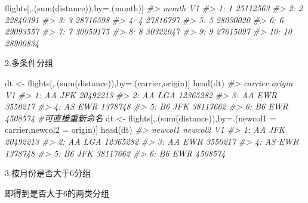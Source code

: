 \documentclass[
]{book}
\newenvironment{Shaded}{\begin{snugshade}}{\end{snugshade}}
\newcommand{\AttributeTok}[1]{\textcolor[rgb]{0.77,0.63,0.00}{#1}}
\newcommand{\CommentTok}[1]{\textcolor[rgb]{0.56,0.35,0.01}{\textit{#1}}}
\newcommand{\FunctionTok}[1]{\textcolor[rgb]{0.00,0.00,0.00}{#1}}
\newcommand{\NormalTok}[1]{#1}
\newcommand{\OtherTok}[1]{\textcolor[rgb]{0.56,0.35,0.01}{#1}}
\begin{document}
\begin{Shaded}
\begin{Highlighting}[]
\NormalTok{flights[,.(}\FunctionTok{sum}\NormalTok{(distance)),by}\OtherTok{=}\NormalTok{.(month)]}
\CommentTok{\#\textgreater{}     month       V1}
\CommentTok{\#\textgreater{}  1:     1 25112563}
\CommentTok{\#\textgreater{}  2:     2 22840391}
\CommentTok{\#\textgreater{}  3:     3 28716598}
\CommentTok{\#\textgreater{}  4:     4 27816797}
\CommentTok{\#\textgreater{}  5:     5 28030020}
\CommentTok{\#\textgreater{}  6:     6 29093557}
\CommentTok{\#\textgreater{}  7:     7 30059175}
\CommentTok{\#\textgreater{}  8:     8 30322047}
\CommentTok{\#\textgreater{}  9:     9 27615097}
\CommentTok{\#\textgreater{} 10:    10 28900834}
\end{Highlighting}
\end{Shaded}

2.多条件分组

\begin{Shaded}
\begin{Highlighting}[]
\NormalTok{dt }\OtherTok{\textless{}{-}}\NormalTok{ flights[,.(}\FunctionTok{sum}\NormalTok{(distance)),by}\OtherTok{=}\NormalTok{.(carrier,origin)]}
\FunctionTok{head}\NormalTok{(dt)}
\CommentTok{\#\textgreater{}    carrier origin       V1}
\CommentTok{\#\textgreater{} 1:      AA    JFK 20492213}
\CommentTok{\#\textgreater{} 2:      AA    LGA 12365282}
\CommentTok{\#\textgreater{} 3:      AA    EWR  3550217}
\CommentTok{\#\textgreater{} 4:      AS    EWR  1378748}
\CommentTok{\#\textgreater{} 5:      B6    JFK 38117662}
\CommentTok{\#\textgreater{} 6:      B6    EWR  4508574}
\CommentTok{\#可直接重新命名}
\NormalTok{dt }\OtherTok{\textless{}{-}}\NormalTok{ flights[,.(}\FunctionTok{sum}\NormalTok{(distance)),by}\OtherTok{=}\NormalTok{.(}\AttributeTok{newcol1 =}\NormalTok{ carrier,}\AttributeTok{newcol2 =}\NormalTok{ origin)]}
\FunctionTok{head}\NormalTok{(dt)}
\CommentTok{\#\textgreater{}    newcol1 newcol2       V1}
\CommentTok{\#\textgreater{} 1:      AA     JFK 20492213}
\CommentTok{\#\textgreater{} 2:      AA     LGA 12365282}
\CommentTok{\#\textgreater{} 3:      AA     EWR  3550217}
\CommentTok{\#\textgreater{} 4:      AS     EWR  1378748}
\CommentTok{\#\textgreater{} 5:      B6     JFK 38117662}
\CommentTok{\#\textgreater{} 6:      B6     EWR  4508574}
\end{Highlighting}
\end{Shaded}

3.按月份是否大于6分组

即得到是否大于6的两类分组
\end{document}
